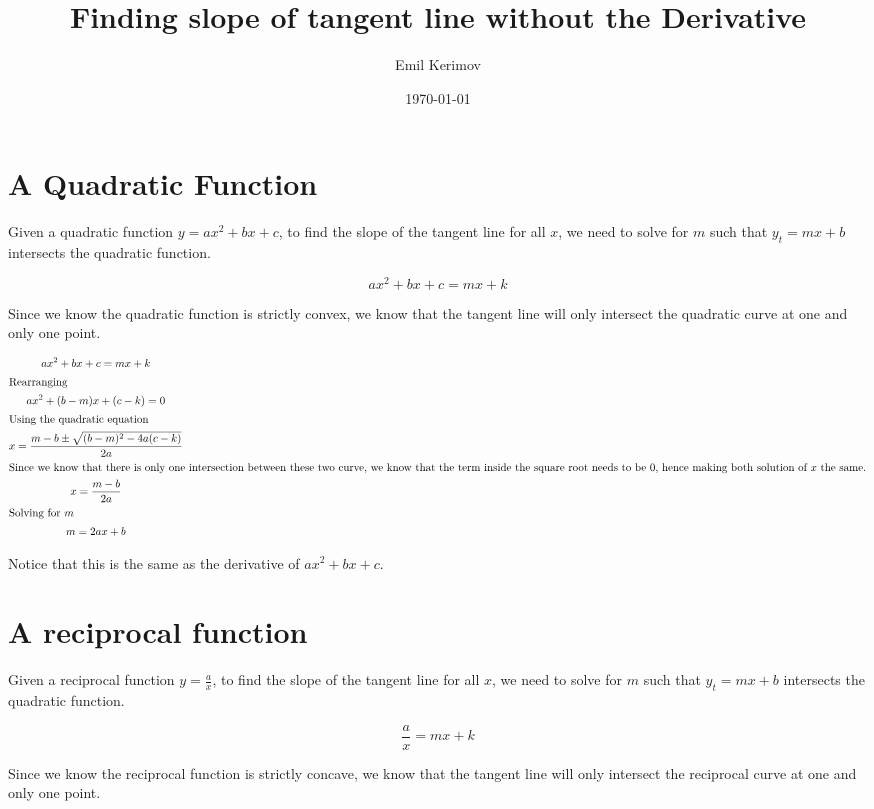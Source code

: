 \documentclass[a4paper]{article}
\title{Finding slope of tangent line without the Derivative}
\author{Emil Kerimov}
\date{\today}
\begin{document}
\maketitle

\section{A Quadratic Function}

Given a quadratic function $ y = ax^2 + bx + c$, to find the slope of the tangent line for all $x$, we need to solve for $m$ such that $y_t = mx+b$ intersects the quadratic function.

\begin{equation}
ax^2 + bx + c = mx+k \label{eq:equation}
\end{equation}

Since we know the quadratic function is strictly convex, we know that the tangent line will only intersect the quadratic curve at one and only one point.

\begin{gather*}
ax^2 + bx + c = mx+k\\
\shortintertext{Rearranging}
ax^2 + (b-m)x + (c-k) = 0\\
\shortintertext{Using the quadratic equation}
x = \frac{m-b \pm \sqrt{(b-m)^2 - 4a(c-k)}}{2a}\\
\shortintertext{Since we know that there is only one intersection between these two curve, we know that the term inside the square root needs to be $0$, hence making both solution of $x$ the same.}
x = \frac{m-b}{2a}\\
\shortintertext{Solving for $m$}
 m = 2ax +b \\
\end{gather*}

Notice that this is the same as the derivative of $ax^2 + bx +c$.

\section{A reciprocal function}\label{sec:a-reciprocal-function}
Given a reciprocal function $ y = \frac{a}{x}$, to find the slope of the tangent line for all $x$, we need to solve for $m$ such that $y_t = mx+b$ intersects the quadratic function.

\begin{equation}
\frac{a}{x} = mx+k \label{eq:equation2}
\end{equation}

Since we know the reciprocal function is strictly concave, we know that the tangent line will only intersect the reciprocal curve at one and only one point.
\end{document}

